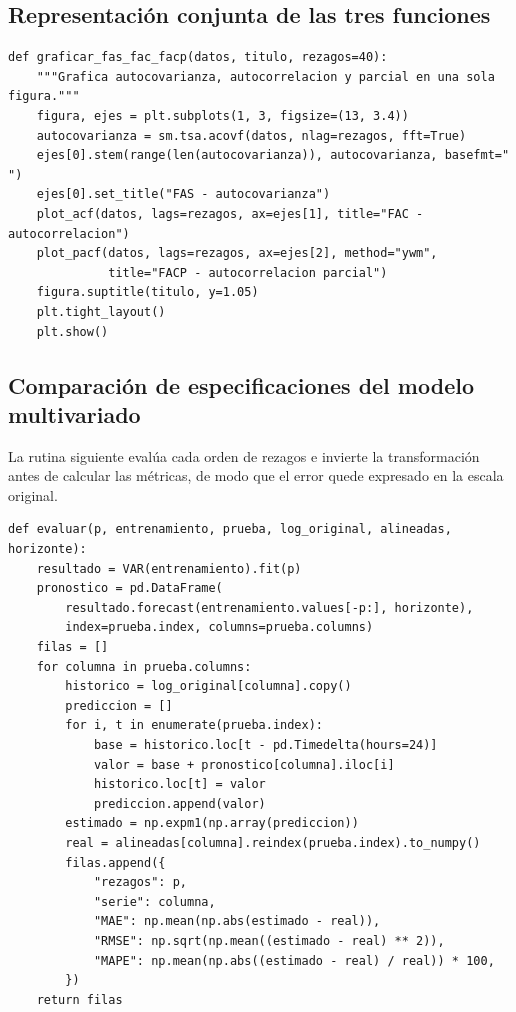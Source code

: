 \subsection*{Representación conjunta de las tres funciones}

\begin{lstlisting}
def graficar_fas_fac_facp(datos, titulo, rezagos=40):
    """Grafica autocovarianza, autocorrelacion y parcial en una sola figura."""
    figura, ejes = plt.subplots(1, 3, figsize=(13, 3.4))
    autocovarianza = sm.tsa.acovf(datos, nlag=rezagos, fft=True)
    ejes[0].stem(range(len(autocovarianza)), autocovarianza, basefmt=" ")
    ejes[0].set_title("FAS - autocovarianza")
    plot_acf(datos, lags=rezagos, ax=ejes[1], title="FAC - autocorrelacion")
    plot_pacf(datos, lags=rezagos, ax=ejes[2], method="ywm",
              title="FACP - autocorrelacion parcial")
    figura.suptitle(titulo, y=1.05)
    plt.tight_layout()
    plt.show()
\end{lstlisting}

\subsection*{Comparación de especificaciones del modelo multivariado}

La rutina siguiente evalúa cada orden de rezagos e invierte la transformación antes de calcular
las métricas, de modo que el error quede expresado en la escala original.

\begin{lstlisting}
def evaluar(p, entrenamiento, prueba, log_original, alineadas, horizonte):
    resultado = VAR(entrenamiento).fit(p)
    pronostico = pd.DataFrame(
        resultado.forecast(entrenamiento.values[-p:], horizonte),
        index=prueba.index, columns=prueba.columns)
    filas = []
    for columna in prueba.columns:
        historico = log_original[columna].copy()
        prediccion = []
        for i, t in enumerate(prueba.index):
            base = historico.loc[t - pd.Timedelta(hours=24)]
            valor = base + pronostico[columna].iloc[i]
            historico.loc[t] = valor
            prediccion.append(valor)
        estimado = np.expm1(np.array(prediccion))
        real = alineadas[columna].reindex(prueba.index).to_numpy()
        filas.append({
            "rezagos": p,
            "serie": columna,
            "MAE": np.mean(np.abs(estimado - real)),
            "RMSE": np.sqrt(np.mean((estimado - real) ** 2)),
            "MAPE": np.mean(np.abs((estimado - real) / real)) * 100,
        })
    return filas
\end{lstlisting}
